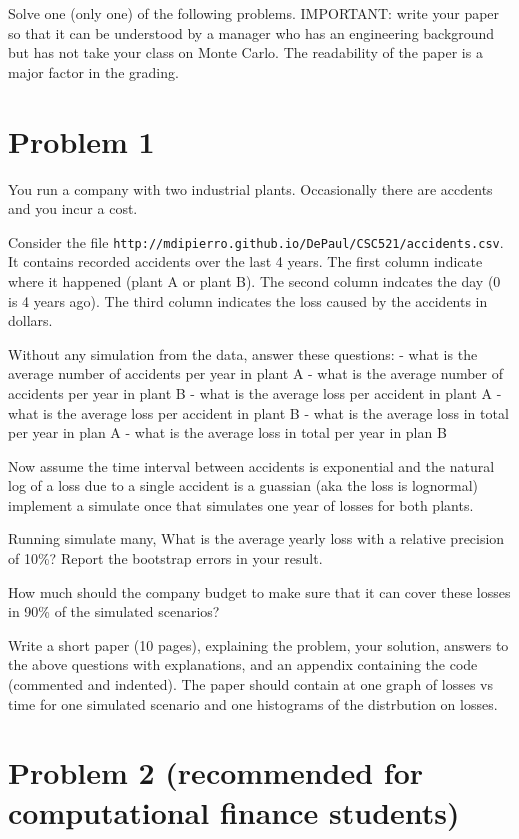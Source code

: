 \documentclass[12pt]{article}
\begin{document}
Solve one (only one) of the following problems. IMPORTANT: write your paper so that it can be understood by a manager who has an engineering background but has not take your class on Monte Carlo. The readability of the paper is a major factor in the grading.

\section*{Problem 1}

You run a company with two industrial plants. Occasionally there are accdents and you incur a cost. 

Consider the file {\tt http://mdipierro.github.io/DePaul/CSC521/accidents.csv}. It contains recorded accidents over the last 4 years. The first column indicate where it happened (plant A or plant B). The second column indcates the day (0 is 4 years ago). The third column indicates the loss caused by the accidents in dollars.

Without any simulation from the data, answer these questions:
- what is the average number of accidents per year in plant A
- what is the average number of accidents per year in plant B
- what is the average loss per accident in plant A
- what is the average loss per accident in plant B
- what is the average loss in total per year in plan A
- what is the average loss in total per year in plan B

Now assume the time interval between accidents is exponential and the natural log of a loss due to a single accident is a guassian (aka the loss is lognormal) implement a simulate once that simulates one year of losses for both plants.

Running simulate many, What is the average yearly loss with a relative precision of 10\%?
Report the bootstrap errors in your result.

How much should the company budget to make sure that it can cover these losses in 90\% of the simulated scenarios?

Write a short paper (10 pages), explaining the problem, your solution, answers to the above questions with explanations, and an appendix containing the code (commented and indented). The paper should contain at one graph of losses vs time for one simulated scenario and one histograms of the distrbution on losses.

\section*{Problem 2 (recommended for computational finance students)}
\end{document}
